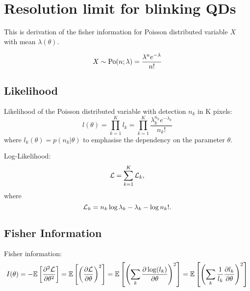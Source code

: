 \chapter{Resolution limit for blinking QDs\label{app:Appendix2}}


This is derivation of the fisher information for Poisson distributed
variable $X$ with mean $\lambda(\theta)$.

\begin{equation}
X\sim\mathrm{Po}(n;\lambda)=\frac{\lambda^{n}e^{-\lambda}}{n!}
\end{equation}



\section{Likelihood}

Likelihood of the Poisson distributed variable with detection $n_k$ in K pixels: 
%
\begin{equation}
	l(\theta)=\prod_{k=1}^Kl_k=\prod_{k=1}^K\frac{\lambda_k^{n_k}e^{-\lambda_k}}{n_k!}\label{eq:app-Likelihood of Poisson}
\end{equation}
%
where $l_k(\theta)=p(n_k|\theta)$ to emphasise the dependency on the parameter $\theta$.

Log-Likelihood:
\begin{equation}
	\mathcal{L}=\sum_{k=1}^K\mathcal{L}_k, 
\end{equation}
%
where
%
\begin{equation}
	\mathcal{L}_k=n_k\log\lambda_k-\lambda_k-\log n_k!. 
	\label{eq:app-loglik}
\end{equation}



\section{Fisher Information}

Fisher information:
\begin{equation}
	I(\theta)=-\mathbb{E}\left[\frac{\partial^2\mathcal{L}}{\partial\theta^2}\right]=\mathbb{E}\left[\left(\frac{\partial\mathcal{L}}{\partial\theta}\right)^2\right]=\mathbb{E}\left[\left(\sum_k\frac{\partial\log(l_k)}{\partial\theta}\right)^2\right]=\mathbb{E}\left[\left(\sum_k\frac{1}{l_k}\frac{\partial l_k}{\partial\theta}\right)^2\right]\label{eq:app-Fisher Info Definition}
\end{equation}


